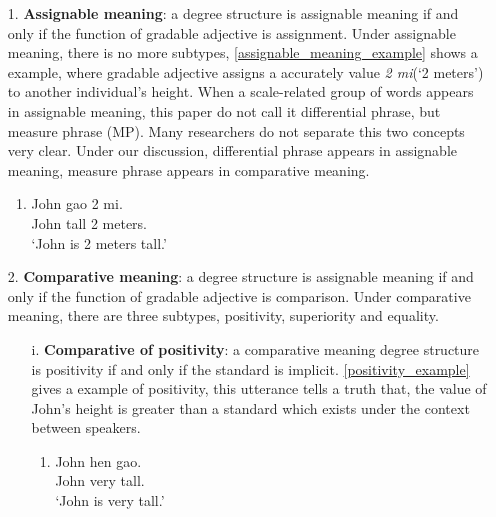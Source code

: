 \documentclass{ctexart}
\begin{document}
\begin{itemize}

    \item[1.] \textbf{Assignable meaning}: a degree structure is assignable meaning if and only if the function of gradable adjective is assignment. Under assignable meaning, there is no more subtypes, \ref{assignable_meaning_example} shows a example, where gradable adjective assigns a accurately value \textit{2 mi}(`2 meters') to another individual's height. When a scale-related group of words appears in assignable meaning, this paper do not call it differential phrase, but measure phrase (MP). Many researchers do not separate this two concepts very clear. Under our discussion, differential phrase appears in assignable meaning, measure phrase appears in comparative meaning. 
    
    \begin{enumerate}
        \item \label{assignable_meaning_example}
        John gao 2 mi.\\
        John tall 2 meters. \\
        `John is 2 meters tall.'
    \end{enumerate}
    
    \item[2.] \textbf{Comparative meaning}: a degree structure is assignable meaning if and only if the function of gradable adjective is comparison. Under comparative meaning, there are three subtypes, positivity, superiority and equality. 
    
    \begin{itemize}

        \item[i.] \textbf{Comparative of positivity}: a comparative meaning degree structure is positivity if and only if the standard is implicit. \ref{positivity_example} gives a example of positivity, this utterance tells a truth that, the value of John's height is greater than a standard which exists under the context between speakers. 
        
        \begin{enumerate}
            \item \label{positivity_example}
            John hen gao. \\
            John very tall. \\
            `John is very tall.'
        \end{enumerate}
        

\end{itemize}
\end{itemize}
\end{document}
